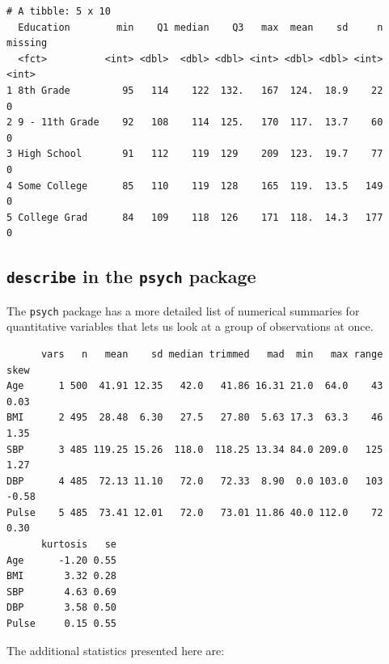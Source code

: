 \documentclass[
]{book}
\newenvironment{Shaded}{\begin{snugshade}}{\end{snugshade}}
\newcommand{\KeywordTok}[1]{\textcolor[rgb]{0.13,0.29,0.53}{\textbf{#1}}}
\newcommand{\NormalTok}[1]{#1}
\newcommand{\OperatorTok}[1]{\textcolor[rgb]{0.81,0.36,0.00}{\textbf{#1}}}
\newcommand{\StringTok}[1]{\textcolor[rgb]{0.31,0.60,0.02}{#1}}
\begin{document}
\begin{verbatim}
# A tibble: 5 x 10
  Education        min    Q1 median    Q3   max  mean    sd     n missing
  <fct>          <int> <dbl>  <dbl> <dbl> <int> <dbl> <dbl> <int>   <int>
1 8th Grade         95   114    122  132.   167  124.  18.9    22       0
2 9 - 11th Grade    92   108    114  125.   170  117.  13.7    60       0
3 High School       91   112    119  129    209  123.  19.7    77       0
4 Some College      85   110    119  128    165  119.  13.5   149       0
5 College Grad      84   109    118  126    171  118.  14.3   177       0
\end{verbatim}

\hypertarget{describe-in-the-psych-package}{%
\subsection{\texorpdfstring{\texttt{describe} in the \texttt{psych} package}{describe in the psych package}}\label{describe-in-the-psych-package}}

The \texttt{psych} package has a more detailed list of numerical summaries for quantitative variables that lets us look at a group of observations at once.

\begin{Shaded}
\end{Shaded}

\begin{verbatim}
      vars   n   mean    sd median trimmed   mad  min   max range  skew
Age      1 500  41.91 12.35   42.0   41.86 16.31 21.0  64.0    43  0.03
BMI      2 495  28.48  6.30   27.5   27.80  5.63 17.3  63.3    46  1.35
SBP      3 485 119.25 15.26  118.0  118.25 13.34 84.0 209.0   125  1.27
DBP      4 485  72.13 11.10   72.0   72.33  8.90  0.0 103.0   103 -0.58
Pulse    5 485  73.41 12.01   72.0   73.01 11.86 40.0 112.0    72  0.30
      kurtosis   se
Age      -1.20 0.55
BMI       3.32 0.28
SBP       4.63 0.69
DBP       3.58 0.50
Pulse     0.15 0.55
\end{verbatim}

The additional statistics presented here are:
\end{document}
